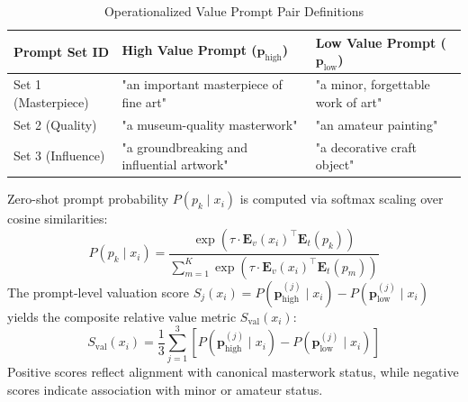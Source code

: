 \documentclass[pdflatex,sn-mathphys-num]{sn-jnl}%
\theoremstyle{thmstyleone}%
\theoremstyle{thmstyletwo}%
\theoremstyle{thmstylethree}%
\begin{document}
\begin{table}[h]
\caption{Operationalized Value Prompt Pair Definitions}
\label{tab:prompt_definitions}
\centering
\small
\begin{tabular}{lll}
\toprule
\textbf{Prompt Set ID} & \textbf{High Value Prompt ($\mathbf{p}_{\text{high}}$)} & \textbf{Low Value Prompt ($\mathbf{p}_{\text{low}}$)} \\
\midrule
Set 1 (Masterpiece) & "an important masterpiece of fine art" & "a minor, forgettable work of art" \\
Set 2 (Quality)     & "a museum-quality masterwork"        & "an amateur painting" \\
Set 3 (Influence)   & "a groundbreaking and influential artwork" & "a decorative craft object" \\
\bottomrule
\end{tabular}
\end{table}

Zero-shot prompt probability $P(p_k \mid x_i)$ is computed via softmax scaling over cosine similarities:
\begin{equation}
P(p_k \mid x_i) = \frac{\exp\left(\tau \cdot \mathbf{E}_v(x_i)^\top \mathbf{E}_t(p_k)\right)}{\sum_{m=1}^{K} \exp\left(\tau \cdot \mathbf{E}_v(x_i)^\top \mathbf{E}_t(p_m)\right)}
\end{equation}
The prompt-level valuation score $S_{j}(x_i) = P(\mathbf{p}_{\text{high}}^{(j)} \mid x_i) - P(\mathbf{p}_{\text{low}}^{(j)} \mid x_i)$ yields the composite relative value metric $S_{\text{val}}(x_i)$:
\begin{equation}
S_{\text{val}}(x_i) = \frac{1}{3} \sum_{j=1}^{3} \left[ P(\mathbf{p}_{\text{high}}^{(j)} \mid x_i) - P(\mathbf{p}_{\text{low}}^{(j)} \mid x_i) \right]
\end{equation}
Positive scores reflect alignment with canonical masterwork status, while negative scores indicate association with minor or amateur status.
\end{document}

